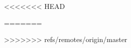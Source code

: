 \documentclass[10pt,a4paper]{report}
\begin{document}
\renewcommand\bibname{References}




\tableofcontents
\listoffigures
\listoftables

\newpage
{} %



<<<<<<< HEAD

=======

>>>>>>> refs/remotes/origin/master




\printglossaries
\end{document}
